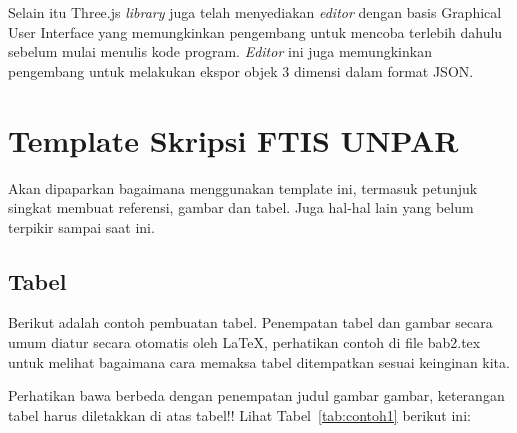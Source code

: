 Selain itu Three.js \textit{library} juga telah menyediakan \textit{editor} dengan basis Graphical User Interface yang memungkinkan pengembang untuk mencoba terlebih dahulu sebelum mulai menulis kode program. \textit{Editor} ini juga memungkinkan pengembang untuk melakukan ekspor objek 3 dimensi dalam format JSON.


\section{Template Skripsi FTIS UNPAR}
\label{sec:template}
 
Akan dipaparkan bagaimana menggunakan template ini, termasuk petunjuk singkat membuat referensi, gambar dan tabel.
Juga hal-hal lain yang belum terpikir sampai saat ini. 
 

\subsection{Tabel}  
Berikut adalah contoh pembuatan tabel. 
Penempatan tabel dan gambar secara umum diatur secara otomatis oleh \LaTeX{}, perhatikan contoh di file bab2.tex untuk melihat bagaimana cara memaksa tabel ditempatkan sesuai keinginan kita.

Perhatikan bawa berbeda dengan penempatan judul gambar gambar, keterangan tabel harus diletakkan di atas tabel!!
Lihat Tabel~\ref{tab:contoh1} berikut ini:

